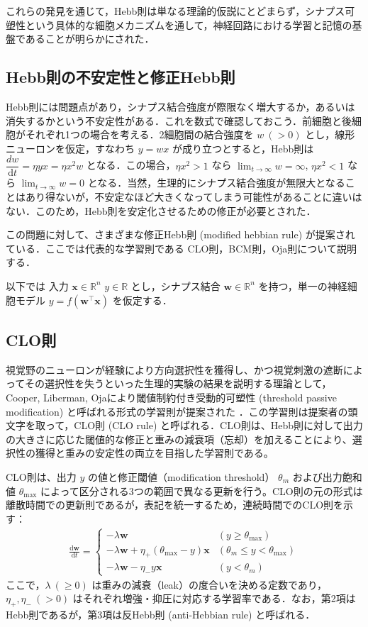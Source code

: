 \documentclass[titlepage]{ltjsbook}
\begin{document}
これらの発見を通じて，Hebb則は単なる理論的仮説にとどまらず，シナプス可塑性という具体的な細胞メカニズムを通して，神経回路における学習と記憶の基盤であることが明らかにされた．

\subsection{Hebb則の不安定性と修正Hebb則}
Hebb則には問題点があり，シナプス結合強度が際限なく増大するか，あるいは消失するかという不安定性がある．これを数式で確認しておこう．前細胞と後細胞がそれぞれ1つの場合を考える．2細胞間の結合強度を $w\ (>0)$ とし，線形ニューロンを仮定，すなわち $y=wx$ が成り立つとすると，Hebb則は $\dfrac{dw}{\mathrm{d}t}=\eta yx=\eta x^2w$ となる．この場合，$\eta x^2>1$ なら $\lim_{t\to\infty} w= \infty$, $\eta x^2<1$ なら $\lim_{t\to\infty} w= 0$ となる．当然，生理的にシナプス結合強度が無限大となることはあり得ないが，不安定なほど大きくなってしまう可能性があることに違いはない．このため，Hebb則を安定化させるための修正が必要とされた．

この問題に対して、さまざまな修正Hebb則 (modified hebbian rule) が提案されている．ここでは代表的な学習則である CLO則，BCM則，Oja則について説明する．

以下では 入力 $\mathbf{x}\in \mathbb{R}^n$ $y\in \mathbb{R}$ とし，シナプス結合 $\mathbf{w}\in \mathbb{R}^n$ を持つ，単一の神経細胞モデル $y = f(\mathbf{w}^\top \mathbf{x})$ を仮定する．

\subsection{CLO則}
視覚野のニューロンが経験により方向選択性を獲得し、かつ視覚刺激の遮断によってその選択性を失うといった生理的実験の結果を説明する理論として，Cooper, Liberman, Ojaにより閾値制約付き受動的可塑性 (threshold passive modification) と呼ばれる形式の学習則が提案された \citep{Cooper1979-wz}．この学習則は提案者の頭文字を取って，CLO則 (CLO rule) と呼ばれる．CLO則は、Hebb則に対して出力の大きさに応じた閾値的な修正と重みの減衰項（忘却）を加えることにより、選択性の獲得と重みの安定性の両立を目指した学習則である。

CLO則は、出力 $y$ の値と修正閾値（modification threshold） $\theta_m$ および出力飽和値 $\theta_\mathrm{max}$ によって区分される3つの範囲で異なる更新を行う。CLO則の元の形式は離散時間での更新則であるが，表記を統一するため，連続時間でのCLO則を示す：
\begin{align}
\frac{\mathrm{d}\mathbf{w}}{\mathrm{d}t} =
\begin{cases}
- \lambda \mathbf{w} & (y \geq \theta_{\max}) \\
- \lambda \mathbf{w} + \eta_+ (\theta_{\max} - y) \mathbf{x} & (\theta_m \leq y < \theta_{\max}) \\
- \lambda \mathbf{w} - \eta_- y \mathbf{x} & (y < \theta_m)
\end{cases}
\end{align}
ここで，$\lambda\ (\geq 0)$ は重みの減衰（leak）の度合いを決める定数であり，$\eta_+, \eta_-\ (> 0)$ はそれぞれ増強・抑圧に対応する学習率である．なお，第2項はHebb則であるが，第3項は反Hebb則 (anti-Hebbian rule) と呼ばれる．
\end{document}
